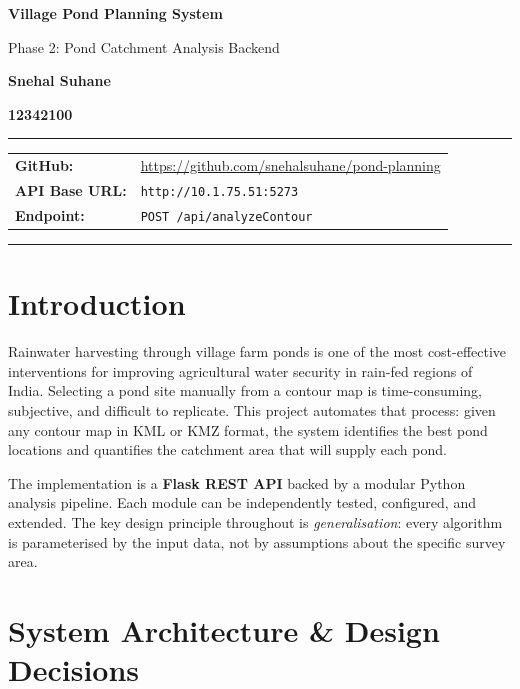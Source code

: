 \documentclass[12pt,a4paper]{article}
\begin{document}
\begin{titlepage}
\centering\vspace*{2cm}
{\Huge\bfseries Village Pond Planning System\par}\vspace{0.5cm}
{\Large Phase 2: Pond Catchment Analysis Backend\par}\vspace{2cm}
{\large\bfseries Snehal Suhane\par}\vspace{0.3cm}
{\large\bfseries 12342100\par}\vspace{0.3cm}
\hrule\vspace{0.4cm}
\begin{tabular}{ll}
\textbf{GitHub:}&\url{https://github.com/snehalsuhane/pond-planning}\\[4pt]
\textbf{API Base URL:}&\texttt{http://10.1.75.51:5273}\\[4pt]
\textbf{Endpoint:}&\texttt{POST /api/analyzeContour}\\
\end{tabular}
\vspace{0.4cm}\hrule
\end{titlepage}
\tableofcontents\newpage

\section{Introduction}

Rainwater harvesting through village farm ponds is one of the most cost-effective interventions for improving agricultural water security in rain-fed regions of India. Selecting a pond site manually from a contour map is time-consuming, subjective, and difficult to replicate. This project automates that process: given any contour map in KML or KMZ format, the system identifies the best pond locations and quantifies the catchment area that will supply each pond.

The implementation is a \textbf{Flask REST API} backed by a modular Python analysis pipeline. Each module can be independently tested, configured, and extended. The key design principle throughout is \emph{generalisation}: every algorithm is parameterised by the input data, not by assumptions about the specific survey area.

\section{System Architecture \& Design Decisions}
\end{document}
